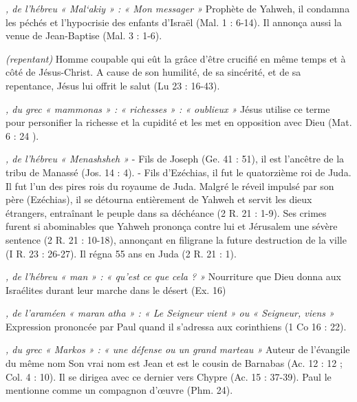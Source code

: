 \begin{multicols}{2}
\textit{, de l'hébreu « Mal`akiy » : « Mon messager »}\newline
Prophète de Yahweh, il condamna les péchés et l'hypocrisie des enfants d'Israël (Mal. 1 : 6-14). Il annonça aussi la venue de Jean-Baptise (Mal. 3 : 1-6).

\textit{(repentant)}\newline
Homme coupable qui eût la grâce d'être crucifié en même temps et à côté de Jésus-Christ. A cause de son humilité, de sa sincérité, et de sa repentance, Jésus lui offrit le salut (Lu 23 : 16-43).

\textit{, du grec « mammonas » : « richesses » : « oublieux »}\newline
Jésus utilise ce terme pour personifier la richesse et la cupidité et les met en opposition avec Dieu (Mat. 6 : 24 ).

\textit{, de l'hébreu « Menashsheh »}\newline
- Fils de Joseph (Ge. 41 : 51), il est l'ancêtre de la tribu de Manassé (Jos. 14 : 4).
- Fils d'Ezéchias, il fut le quatorzième roi de Juda. Il fut l'un des pires rois du royaume de Juda. Malgré le réveil impulsé par son père (Ezéchias), il se détourna entièrement de Yahweh et servit les dieux étrangers, entraînant le peuple dans sa déchéance (2 R. 21 : 1-9). Ses crimes furent si abominables que Yahweh prononça contre lui et Jérusalem une sévère sentence (2 R. 21 : 10-18), annonçant en filigrane la future destruction de la ville (I R. 23 : 26-27). Il régna 55 ans en Juda (2 R. 21 : 1).

\textit{, de l'hébreu « man » : « qu'est ce que cela ? »}\newline
Nourriture que Dieu donna aux Israélites durant leur marche dans le désert (Ex. 16)

\textit{, de l'araméen « maran atha » : « Le Seigneur vient » ou « Seigneur, viens »}\newline
Expression prononcée par Paul quand il s'adressa aux corinthiens (1 Co 16 : 22).

\textit{, du grec « Markos » : « une défense ou un grand marteau »}\newline
Auteur de l'évangile du même nom Son vrai nom est Jean et est le cousin de Barnabas (Ac. 12 : 12 ; Col. 4 : 10). Il se dirigea avec ce dernier vers Chypre (Ac. 15 : 37-39). Paul le mentionne comme un compagnon d'œuvre (Phm. 24).


\end{multicols}
